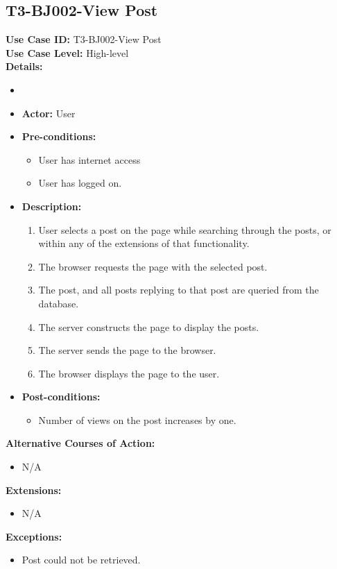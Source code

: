 \subsection{T3-BJ002-View Post}
\textbf{Use Case ID:} T3-BJ002-View Post\\
\textbf{Use Case Level:} High-level\\
\textbf{Details:}
\begin{itemize}
    \item 
    \item \textbf{Actor:} User
    \item \textbf{Pre-conditions:}
    \begin{itemize}
        \item User has internet access
        \item User has logged on.
    \end{itemize}
    \item \textbf{Description:}
    \begin{enumerate}
        \item User selects a post on the page while searching through the posts, or within any of the extensions of that functionality.
        \item The browser requests the page with the selected post.
        \item The post, and all posts replying to that post are queried from the database.
        \item The server constructs the page to display the posts.
        \item The server sends the page to the browser.
        \item The browser displays the page to the user.
    \end{enumerate}
    \item \textbf{Post-conditions:}
    \begin{itemize}
        \item Number of views on the post increases by one.
    \end{itemize}
\end{itemize}
\textbf{Alternative Courses of Action:}
\begin{itemize}
    \item N/A
\end{itemize}
\textbf{Extensions:}
\begin{itemize}
    \item N/A
\end{itemize}
\textbf{Exceptions:}
\begin{itemize}
    \item Post could not be retrieved.
\end{itemize}
